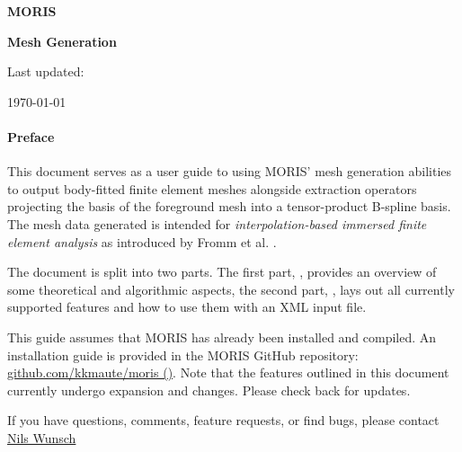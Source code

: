 
\newpage
\thispagestyle{empty}

\vspace{3.0cm}

\bigskip
\centerline{ \Large{ \textbf{ MORIS }}} 
\vspace{0.3cm}
\centerline{ \Large{ \textbf{ Mesh Generation }}}


\vspace{1.0cm}

\begin{center}
	\centerline{Last updated:} 
    \today
\end{center}


\vspace{1.6cm}

\paragraph{Preface}
This document serves as a user guide to using MORIS' mesh generation abilities to output body-fitted finite element meshes alongside extraction operators projecting the basis of the foreground mesh into a tensor-product B-spline basis. The mesh data generated is intended for \emph{interpolation-based immersed finite element analysis} as introduced by Fromm et al. \cite{Fromm2022}. 

The document is split into two parts. The first part, ,  provides an overview of some theoretical and algorithmic aspects, the second part, , lays out all currently supported features and how to use them with an \textsc{XML} input file. 

This guide assumes that MORIS has already been installed and compiled. An installation guide is provided in the MORIS GitHub repository:
\href{https://github.com/kkmaute/moris/tree/main/share/install}{github.com/kkmaute/moris (\ExternalLink)}.
Note that the features outlined in this document currently undergo expansion and changes. Please check back for updates.

If you have questions, comments, feature requests, or find bugs, please contact \href{mailto:nils.wunsch@colorado.com}{Nils Wunsch \Letter}


